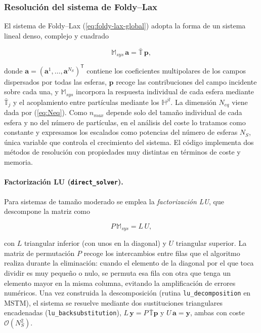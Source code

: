 \subsubsection{Resolución del sistema de Foldy--Lax}
\label{sec:solver}

El sistema de Foldy--Lax (\ref{eq:foldy-lax-global}) adopta la forma de
un sistema lineal denso, complejo y cuadrado

\begin{equation}
  \mathbb{M}_{sys}\,\mathbf{a} = \bar{\mathbb{T}}\,\mathbf{p},
\end{equation}

donde $\mathbf{a} = (\mathbf{a}^1,\ldots,\mathbf{a}^{N_S})^{\mathsf{T}}$
contiene los coeficientes multipolares de los campos dispersados por
todas las esferas, $\mathbf{p}$ recoge las contribuciones del campo
incidente sobre cada una, y $\mathbb{M}_{sys}$ incorpora la respuesta
individual de cada esfera mediante $\bar{\mathbb{T}}_j$ y el
acoplamiento entre partículas mediante los $\mathbb{H}^{jl}$. La
dimensión $N_{eq}$ viene dada por (\ref{eq:Neq}). Como $n_{max}$ depende
solo del tamaño individual de cada esfera y no del número de partículas,
en el análisis del coste lo tratamos como constante y expresamos los
escalados como potencias del número de esferas $N_S$, única variable que
controla el crecimiento del sistema. El código implementa dos métodos
de resolución con propiedades muy distintas en términos de coste y
memoria.

\paragraph{Factorización LU (\texttt{direct\_solver}).}
Para sistemas de tamaño moderado se emplea la \textit{factorización LU},
que descompone la matriz como

\begin{equation}
  P\,\mathbb{M}_{sys} = L\,U,
\end{equation}

con $L$ triangular inferior (con unos en la diagonal) y $U$ triangular
superior. La matriz de permutación $P$ recoge los intercambios entre
filas que el algoritmo realiza durante la eliminación: cuando el
elemento de la diagonal por el que toca dividir es muy pequeño o nulo,
se permuta esa fila con otra que tenga un elemento mayor en la misma
columna, evitando la amplificación de errores numéricos. Una vez
construida la descomposición (rutina \texttt{lu\_decomposition} en
MSTM), el sistema se resuelve mediante dos sustituciones triangulares
encadenadas (\texttt{lu\_backsubstitution}),
$L\,\mathbf{y} = P\,\bar{\mathbb{T}}\mathbf{p}$ y
$U\,\mathbf{a} = \mathbf{y}$, ambas con coste $\mathcal{O}(N_S^2)$.

